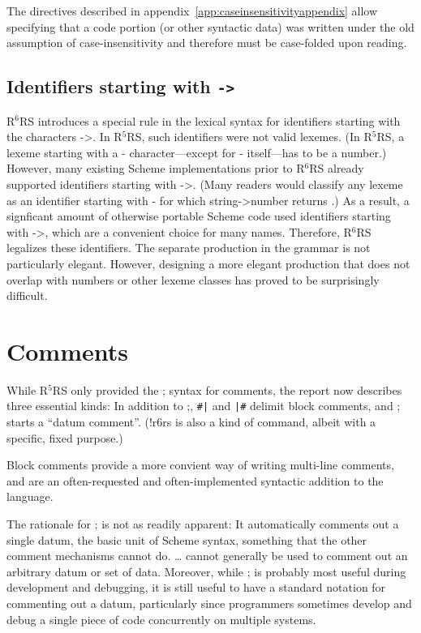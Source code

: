 \documentclass[twoside,twocolumn]{algol60}
\newcommand{\rn}[1]{R$^{#1}$RS}
\begin{document}
The directives described in appendix~\ref{app:caseinsensitivityappendix}
allow specifying that a code portion (or other syntactic data) was
written under the old assumption of case-insensitivity and therefore
must be case-folded upon reading.

\subsection{Identifiers starting with {\tt ->}}

\rn{6} introduces a special rule in the lexical syntax for
identifiers starting with the characters {\cf ->}.  In \rn{5}, such
identifiers were not valid lexemes.  (In \rn{5}, a lexeme starting
with a {\cf -} character---except for {\cf -} itself---has to be a
number.)
However, many existing
Scheme implementations prior to \rn{6} already supported identifiers
starting with {\cf ->}.  (Many readers would classify any lexeme as an
identifier starting with {\cf -} for which {\cf string->number}
returns \schfalse{}.)  As a result, a signficant amount of otherwise
portable Scheme code used identifiers starting with {\cf ->}, which
are a convenient choice for many names.  Therefore, \rn{6} legalizes
these identifiers.  The separate production in the grammar is not particularly elegant.
However, designing a more elegant production that does not overlap with
numbers or other lexeme classes has proved to be surprisingly
difficult.

 
\section{Comments}

While \rn{5} only provided the {\cf;} syntax for comments, the report
now describes three essential kinds: In addition to {\cf;}, {\tt \#|}
and {\tt |\#} delimit block comments, and {\cf\sharpsign;} starts a
``datum comment''.  ({\cf\sharpsign!r6rs} is also a kind of command,
albeit with a specific, fixed purpose.) 

Block comments provide a more convient way of writing multi-line
comments, and are an often-requested and often-implemented syntactic
addition to the language. 

The rationale for {\cf\sharpsign;} is not as readily apparent: It
automatically comments out a single datum, the basic unit of Scheme
syntax, something that the other comment mechanisms cannot do.  {\cf
  \sharpsign\verticalbar} \ldots {\cf \verticalbar\sharpsign} cannot
generally be used to comment out an arbitrary datum or set of data.
Moreover, while {\cf\sharpsign;} is probably most useful during
development and debugging, it is still useful to have a standard
notation for commenting out a datum, particularly since programmers
sometimes develop and debug a single piece of code concurrently on
multiple systems.
\end{document}
